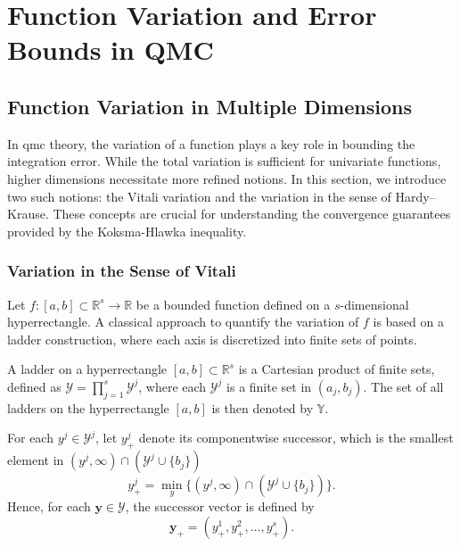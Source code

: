 \chapter{Function Variation and Error Bounds in QMC}
\label{chapter3}

\section{Function Variation in Multiple Dimensions}

In \acf{qmc} theory, the variation of a function plays a key role in bounding
the integration error. While the total variation is sufficient for univariate
functions, higher dimensions necessitate more refined notions. In this section,
we introduce two such notions: the Vitali variation and the variation in the
sense of Hardy--Krause. These concepts are crucial for understanding the
convergence guarantees provided by the Koksma-Hlawka inequality.


\subsection{Variation in the Sense of Vitali}
\label{sec:vitali-variation}

Let $f \colon [a,b] \subset \mathbb{R}^s \to \mathbb{R}$ be a bounded function
defined on a $s$-dimensional hyperrectangle. A classical approach to quantify
the variation of $f$ is based on a ladder construction, where each axis is
discretized into finite sets of points.

A ladder on a hyperrectangle $[a,b] \subset \mathbb{R}^s$ is a Cartesian product
of finite sets, defined as $\mathcal{Y} = \prod_{j=1}^s \mathcal{Y}^j$, where
each $\mathcal{Y}^j$ is a finite set in $(a_j, b_j)$. The set of all ladders on
the hyperrectangle $[a,b]$ is then denoted by $\mathbb{Y}$.

For each $y^j \in \mathcal{Y}^j$, let $y^j_+$ denote its componentwise
successor, which is the smallest element in $(y^j,\infty)\cap (\mathcal{Y}^j
\cup \{b_j\})$
\begin{equation*}
    y^j_+ = \min\limits_y\{(y^j,\infty)\cap (\mathcal{Y}^j
\cup \{b_j\})\}.
\end{equation*}
Hence, for each $\mathbf{y} \in \mathcal{Y}$, the successor vector is defined by
\begin{equation*}
    \mathbf{y}_+ = (y^1_+, y^2_+, \ldots, y^s_+).
\end{equation*}

